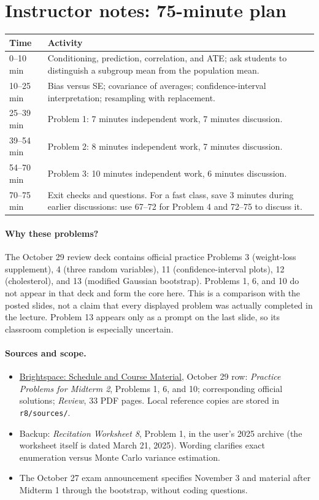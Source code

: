 \documentclass[11pt]{article}
\newif\ifsolutions
\begin{document}
\ifsolutions
\newpage
\section*{Instructor notes: 75-minute plan}
\begin{center}
\begin{tabular}{@{}p{}p{}@{}}
\toprule Time & Activity\\\midrule
0--10 min & Conditioning, prediction, correlation, and ATE; ask students to
 distinguish a subgroup mean from the population mean.\\
10--25 min & Bias versus SE; covariance of averages; confidence-interval
 interpretation; resampling with replacement.\\
25--39 min & Problem 1: 7 minutes independent work, 7 minutes discussion.\\
39--54 min & Problem 2: 8 minutes independent work, 7 minutes discussion.\\
54--70 min & Problem 3: 10 minutes independent work, 6 minutes discussion.\\
70--75 min & Exit checks and questions. For a fast class, save 3 minutes
 during earlier discussions: use 67--72 for Problem 4 and 72--75 to discuss it.\\
\bottomrule
\end{tabular}
\end{center}

\paragraph{Why these problems?}
The October 29 review deck contains official practice Problems 3
(weight-loss supplement), 4 (three random variables), 11 (confidence-interval
plots), 12 (cholesterol), and 13 (modified Gaussian bootstrap).
Problems 1, 6, and 10 do not appear in that deck and form the core here.
This is a comparison with the posted slides, not a claim that every displayed
problem was actually completed in the lecture. Problem 13 appears only as
a prompt on the last slide, so its classroom completion is especially uncertain.

\paragraph{Sources and scope.}
\begin{itemize}
 \item \href{https://brightspace.nyu.edu/d2l/le/lessons/613220/units/13329394}
 {Brightspace: Schedule and Course Material}, October 29 row:
 \emph{Practice Problems for Midterm 2}, Problems 1, 6, and 10;
 corresponding official solutions; \emph{Review}, 33 PDF pages.
 Local reference copies are stored in \texttt{r8/sources/}.
 \item Backup: \emph{Recitation Worksheet 8}, Problem 1, in the user's 2025
 archive (the worksheet itself is dated March 21, 2025).
 Wording clarifies exact enumeration versus Monte Carlo variance estimation.
 \item The October 27 exam announcement specifies November 3 and material
 after Midterm 1 through the bootstrap, without coding questions.
\end{itemize}
\end{document}
